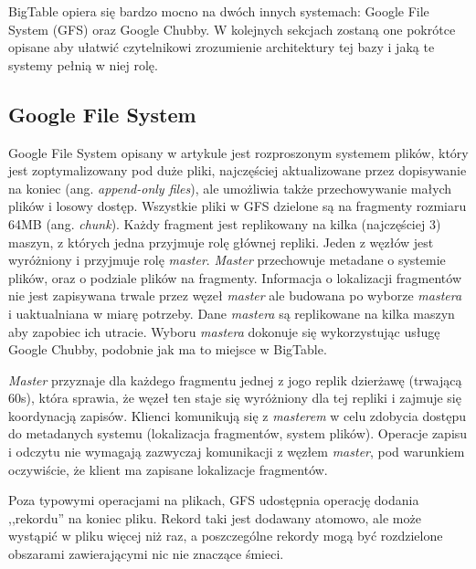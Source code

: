 BigTable opiera się bardzo mocno na dwóch innych systemach: Google File System (GFS) oraz Google Chubby.
W kolejnych sekcjach zostaną one pokrótce opisane aby ułatwić czytelnikowi zrozumienie architektury tej bazy i jaką te systemy pełnią w niej rolę.

\subsection*{Google File System}

Google File System opisany w artykule \cite{google-file-system} jest rozproszonym systemem plików, który jest zoptymalizowany pod duże pliki, najczęściej aktualizowane przez dopisywanie na koniec (ang. \emph{append-only files}), ale umożliwia także przechowywanie małych plików i losowy dostęp.
Wszystkie pliki w GFS dzielone są na fragmenty rozmiaru 64MB (ang. \emph{chunk}).
Każdy fragment jest replikowany na kilka (najczęściej 3) maszyn, z których jedna przyjmuje rolę głównej repliki.
Jeden z węzłów jest wyróżniony i przyjmuje rolę \emph{master}.
\emph{Master} przechowuje metadane o systemie plików, oraz o podziale plików na fragmenty.
Informacja o lokalizacji fragmentów nie jest zapisywana trwale przez węzeł \emph{master} ale budowana po wyborze \emph{mastera} i uaktualniana w miarę potrzeby.
Dane \emph{mastera} są replikowane na kilka maszyn aby zapobiec ich utracie.
Wyboru \emph{mastera} dokonuje się wykorzystując usługę Google Chubby, podobnie jak ma to miejsce w BigTable.

\emph{Master} przyznaje dla każdego fragmentu jednej z jogo replik dzierżawę (trwającą 60s), która sprawia, że węzeł ten staje się wyróżniony dla tej repliki i zajmuje się koordynacją zapisów.
Klienci komunikują się z \emph{masterem} w celu zdobycia dostępu do metadanych systemu (lokalizacja fragmentów, system plików).
Operacje zapisu i odczytu nie wymagają zazwyczaj komunikacji z węzłem \emph{master}, pod warunkiem oczywiście, że klient ma zapisane lokalizacje fragmentów.

Poza typowymi operacjami na plikach, GFS udostępnia operację dodania ,,rekordu'' na koniec pliku.
Rekord taki jest dodawany atomowo, ale może wystąpić w pliku więcej niż raz, a poszczególne rekordy mogą być rozdzielone obszarami zawierającymi nic nie znaczące śmieci.

